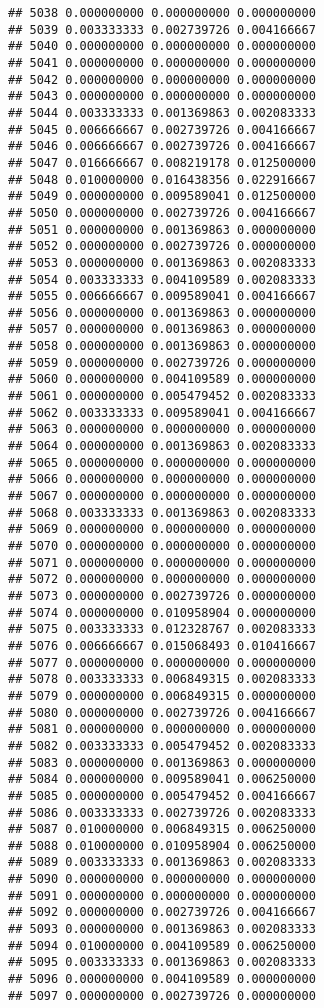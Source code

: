 \documentclass[
]{article}
\begin{document}
\begin{verbatim}
## 5038 0.000000000 0.000000000 0.000000000
## 5039 0.003333333 0.002739726 0.004166667
## 5040 0.000000000 0.000000000 0.000000000
## 5041 0.000000000 0.000000000 0.000000000
## 5042 0.000000000 0.000000000 0.000000000
## 5043 0.000000000 0.000000000 0.000000000
## 5044 0.003333333 0.001369863 0.002083333
## 5045 0.006666667 0.002739726 0.004166667
## 5046 0.006666667 0.002739726 0.004166667
## 5047 0.016666667 0.008219178 0.012500000
## 5048 0.010000000 0.016438356 0.022916667
## 5049 0.000000000 0.009589041 0.012500000
## 5050 0.000000000 0.002739726 0.004166667
## 5051 0.000000000 0.001369863 0.000000000
## 5052 0.000000000 0.002739726 0.000000000
## 5053 0.000000000 0.001369863 0.002083333
## 5054 0.003333333 0.004109589 0.002083333
## 5055 0.006666667 0.009589041 0.004166667
## 5056 0.000000000 0.001369863 0.000000000
## 5057 0.000000000 0.001369863 0.000000000
## 5058 0.000000000 0.001369863 0.000000000
## 5059 0.000000000 0.002739726 0.000000000
## 5060 0.000000000 0.004109589 0.000000000
## 5061 0.000000000 0.005479452 0.002083333
## 5062 0.003333333 0.009589041 0.004166667
## 5063 0.000000000 0.000000000 0.000000000
## 5064 0.000000000 0.001369863 0.002083333
## 5065 0.000000000 0.000000000 0.000000000
## 5066 0.000000000 0.000000000 0.000000000
## 5067 0.000000000 0.000000000 0.000000000
## 5068 0.003333333 0.001369863 0.002083333
## 5069 0.000000000 0.000000000 0.000000000
## 5070 0.000000000 0.000000000 0.000000000
## 5071 0.000000000 0.000000000 0.000000000
## 5072 0.000000000 0.000000000 0.000000000
## 5073 0.000000000 0.002739726 0.000000000
## 5074 0.000000000 0.010958904 0.000000000
## 5075 0.003333333 0.012328767 0.002083333
## 5076 0.006666667 0.015068493 0.010416667
## 5077 0.000000000 0.000000000 0.000000000
## 5078 0.003333333 0.006849315 0.002083333
## 5079 0.000000000 0.006849315 0.000000000
## 5080 0.000000000 0.002739726 0.004166667
## 5081 0.000000000 0.000000000 0.000000000
## 5082 0.003333333 0.005479452 0.002083333
## 5083 0.000000000 0.001369863 0.000000000
## 5084 0.000000000 0.009589041 0.006250000
## 5085 0.000000000 0.005479452 0.004166667
## 5086 0.003333333 0.002739726 0.002083333
## 5087 0.010000000 0.006849315 0.006250000
## 5088 0.010000000 0.010958904 0.006250000
## 5089 0.003333333 0.001369863 0.002083333
## 5090 0.000000000 0.000000000 0.000000000
## 5091 0.000000000 0.000000000 0.000000000
## 5092 0.000000000 0.002739726 0.004166667
## 5093 0.000000000 0.001369863 0.002083333
## 5094 0.010000000 0.004109589 0.006250000
## 5095 0.003333333 0.001369863 0.002083333
## 5096 0.000000000 0.004109589 0.000000000
## 5097 0.000000000 0.002739726 0.000000000

\end{verbatim}
\end{document}
